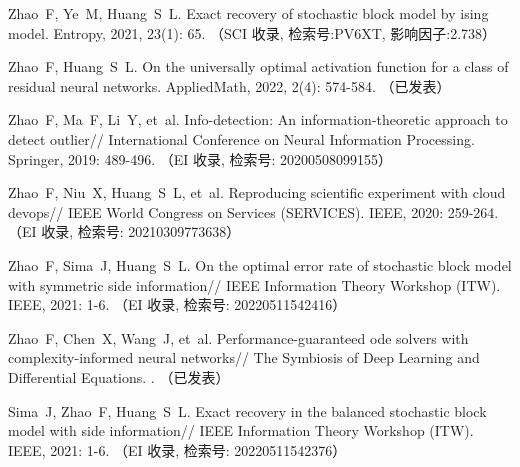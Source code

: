 \begin{resume}
  \begin{achievements}
    \item Zhao~F, Ye~M, Huang~S~L.
    \newblock Exact recovery of stochastic block model by ising
      model\allowbreak[J].
    \newblock Entropy, 2021{}, 23\allowbreak (1): 65.
    （SCI 收录, 检索号:PV6XT, 影响因子:2.738）
    \item Zhao~F, Huang~S~L.
    \newblock On the universally optimal activation function for a class of
      residual neural networks\allowbreak[J].
      \newblock AppliedMath, 2022, 2\allowbreak (4): 574-584.
      （已发表）
      \item Zhao~F, Ma~F, Li~Y, et~al.
    \newblock Info-detection: An information-theoretic approach to detect
      outlier\allowbreak[C]//\allowbreak
    International Conference on Neural Information Processing.
    \newblock Springer, 2019: 489-496.
    （EI 收录, 检索号: 20200508099155）
    \item Zhao~F, Niu~X, Huang~S~L, et~al.
    \newblock Reproducing scientific experiment with cloud
      devops\allowbreak[C]// IEEE World Congress on Services (SERVICES).
    \newblock IEEE, 2020: 259-264.
    （EI 收录, 检索号: 20210309773638）
    \item Zhao~F, Sima~J, Huang~S~L.
    \newblock On the optimal error rate of stochastic block model with symmetric
      side information\allowbreak[C]// IEEE Information Theory Workshop (ITW).
    \newblock IEEE, 2021{}: 1-6.
    （EI 收录, 检索号: 20220511542416）
    \item Zhao~F, Chen~X, Wang~J, et~al.
    \newblock Performance-guaranteed ode solvers with complexity-informed neural
      networks\allowbreak[C]//\allowbreak
    The Symbiosis of Deep Learning and Differential Equations.
    .
    （已发表）
    \item Sima~J, Zhao~F, Huang~S~L.
    \newblock Exact recovery in the balanced stochastic block model with side
      information\allowbreak[C]// IEEE Information Theory Workshop (ITW).
    \newblock IEEE, 2021: 1-6.
    （EI 收录, 检索号: 20220511542376）
  \end{achievements}




\end{resume}
